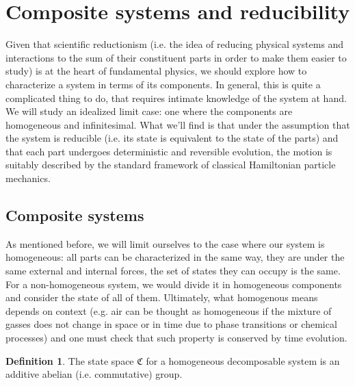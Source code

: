 \documentclass[aps,pra,10pt,twocolumn,floatfix,nofootinbib]{revtex4-1}
\theoremstyle{definition}
\newtheorem{defn}[prop]{Definition}
\begin{document}
\section{Composite systems and reducibility}

Given that scientific reductionism (i.e. the idea of reducing physical systems and interactions to the sum of their constituent parts in order to make them easier to study) is at the heart of fundamental physics, we should explore how to characterize a system in terms of its components. In general, this is quite a complicated thing to do, that requires intimate knowledge of the system at hand. We will study an idealized limit case: one where the components are homogeneous and infinitesimal. What we'll find is that under the assumption that the system is reducible (i.e. its state is equivalent to the state of the parts) and that each part undergoes deterministic and reversible evolution, the motion is suitably described by the standard framework of classical Hamiltonian particle mechanics.

\subsection{Composite systems}
As mentioned before, we will limit ourselves to the case where our system is homogeneous: all parts can be characterized in the same way, they are under the same external and internal forces, the set of states they can occupy is the same. For a non-homogeneous system, we would divide it in homogeneous components and consider the state of all of them. Ultimately, what homogenous means depends on context (e.g. air can be thought as homogeneous if the mixture of gasses does not change in space or in time due to phase transitions or chemical processes) and one must check that such property is conserved by time evolution.

\begin{defn}\label{reducible_state_space}
The state space $\mathfrak{C}$ for a homogeneous decomposable system is an additive abelian (i.e. commutative) group.
\end{defn}
\end{document}
